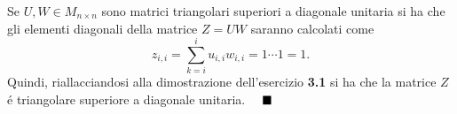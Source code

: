 Se $U,W \in M_{n \times n}$ sono matrici triangolari superiori a diagonale unitaria si ha che gli elementi diagonali della matrice $Z=UW$ saranno calcolati come
\[
z_{i,i} = \sum_{k=i}^{i} u_{i,i}w_{i,i} = 1 \cdots 1 = 1.
\]
Quindi, riallacciandosi alla dimostrazione dell'esercizio \textbf{3.1} si ha che la matrice $Z$ \'e triangolare superiore a diagonale unitaria.
$\hspace{1em}\blacksquare$
